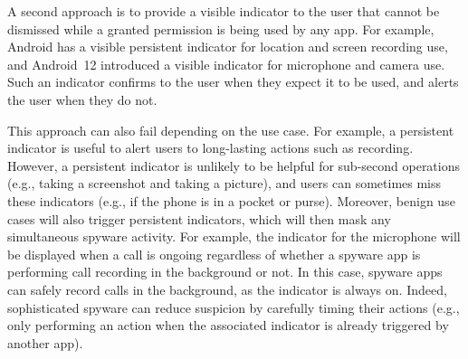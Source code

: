 \documentclass[sigconf,balance=false]{acmart}
\newcommand{\alex}[1]{\textcolor{chicagomaroon}{\noindent[AL: #1]}}
\newcommand{\geoff}[1]{\textcolor{purple}{\noindent[GV: #1]}}
\newcommand{\alex}[1]{}
\newcommand{\geoff}[1]{}
\begin{document}







A second approach is to provide a visible indicator to the user that cannot be
dismissed while a granted permission is being used by any app.  For example,
Android has a visible persistent indicator for location and screen recording
use, and Android~12 introduced a visible indicator for microphone and camera
use. Such an indicator confirms to the user when they expect it to be used, and
alerts the user when they do not.

This approach can also fail depending on the use case.  For example, a
persistent indicator is useful to alert users to long-lasting actions
such as recording. However, a persistent indicator is unlikely to be
helpful for sub-second operations (e.g., taking a screenshot and
taking a picture),
and users can sometimes miss these indicators (e.g., if the phone is
in a pocket or purse).  Moreover, benign use cases will also trigger
persistent indicators, which will then mask any simultaneous spyware
activity.  For example, the indicator for the microphone will be
displayed when a call is ongoing regardless of whether a spyware app
is performing call recording in the background or not.  In this case,
spyware apps can safely record calls in the background, as the
indicator is always on.  Indeed, sophisticated spyware can reduce
suspicion by carefully timing their actions (e.g., only performing an
action when the associated indicator is already triggered by another
app).
\end{document}
